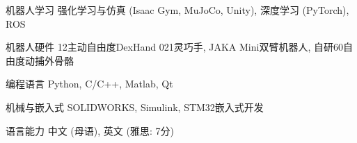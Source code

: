 \vspace{-2mm}
\begin{cvskills}
  \cvskill
   {机器人学习} %
   {强化学习与仿真 (Isaac Gym, MuJoCo, Unity), 深度学习 (PyTorch), ROS} %

  \cvskill
   {机器人硬件} %
   {12主动自由度DexHand 021灵巧手, JAKA Mini双臂机器人, 自研60自由度动捕外骨骼} %

  \cvskill
   {编程语言} %
   {Python, C/C++, Matlab, Qt} %

  \cvskill
   {机械与嵌入式} %
   {SOLIDWORKS, Simulink, STM32嵌入式开发} %

  \cvskill
   {语言能力} %
   {中文 (母语), 英文 (雅思: 7分)} %
\end{cvskills}

